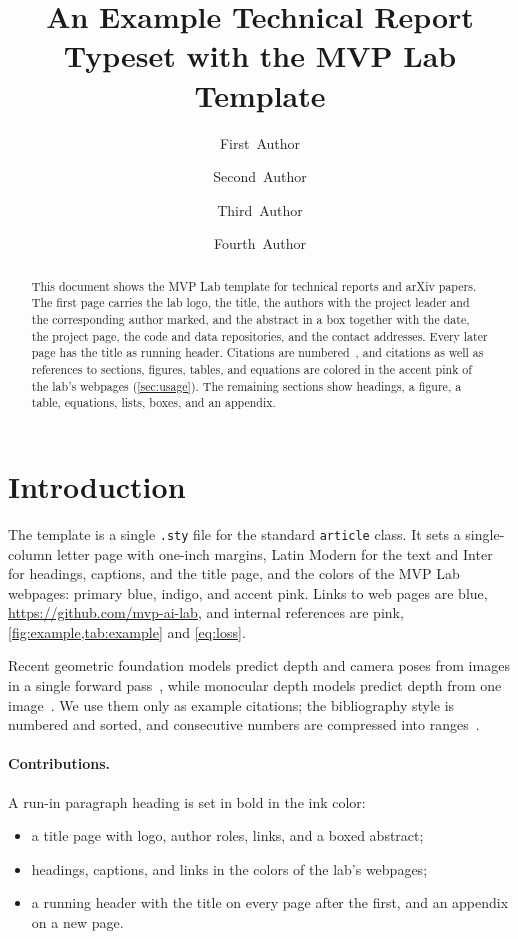 \documentclass[10pt,letterpaper]{article}
\title{An Example Technical Report Typeset with the MVP Lab Template}
\author{First~Author\projectlead \and Second~Author \and Third~Author \and Fourth~Author\corresponding}
\affiliation{MVP Lab \& Imperial College London}
\begin{document}
\begin{abstract}
This document shows the MVP Lab template for technical reports and arXiv papers. The first page carries the lab
logo, the title, the authors with the project leader and the corresponding author marked, and the abstract in a box
together with the date, the project page, the code and data repositories, and the contact addresses. Every later
page has the title as running header. Citations are numbered~\cite{dust3r,vggt}, and citations as well as references
to sections, figures, tables, and equations are colored in the accent pink of the lab's webpages (\cref{sec:usage}).
The remaining sections show headings, a figure, a table, equations, lists, boxes, and an appendix.
\end{abstract}
\maketitle

\section{Introduction}
\label{sec:intro}
The template is a single \texttt{.sty} file for the standard \texttt{article} class. It sets a single-column letter
page with one-inch margins, Latin Modern for the text and Inter for headings, captions, and the title page, and the
colors of the MVP Lab webpages: primary blue, indigo, and accent pink. Links to web pages are blue, \eg
\url{https://github.com/mvp-ai-lab}, and internal references are pink, \eg \cref{fig:example,tab:example} and
\cref{eq:loss}.

Recent geometric foundation models predict depth and camera poses from images in a single forward
pass~\cite{dust3r,vggt}, while monocular depth models predict depth from one image~\cite{midas,depthanything,marigold}.
We use them only as example citations; the bibliography style is numbered and sorted, and consecutive numbers are
compressed into ranges~\cite{midas,depthanything,marigold,dust3r,vggt}.

\paragraph{Contributions.} A run-in paragraph heading is set in bold in the ink color:
\begin{itemize}
  \item a title page with logo, author roles, links, and a boxed abstract;
  \item headings, captions, and links in the colors of the lab's webpages;
  \item a running header with the title on every page after the first, and an appendix on a new page.
\end{itemize}
\end{document}
